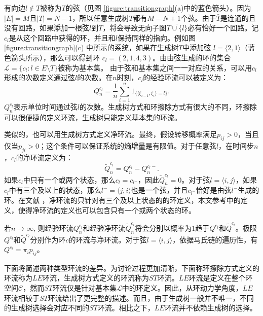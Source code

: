 
有向边$l \notin T$被称为$T$的弦（见图 \ref{figure:transitiongraph}(a)中的蓝色箭头）。因为$|E|=M$且$|T|= N-1$，所以任意生成树$T$都有$M-N+1$个弦。由于$\bar{T}$是连通的且没有回路，如果添加一根弦$l$到$T$，将会导致无向子图$\overline{T \cup \{l\}}$必有恰好一个回路。记$c_l$是从这个回路中获得的环，并且和$l$保持同样的指向。例如图 \ref{figure:transitiongraph}(c) 中所示的系统，如果在生成树$T$中添加弦 $l=\langle 2,1 \rangle$（蓝色箭头所示），那么可以得到环 $c_l=(2,1,4,3)$。由由弦生成的环的集合$\mathcal{L} = \{c_l: l\in E\setminus T\}$被称为基本集。
由于弦和基本集之间一一对应的关系，可以用$c_l$形成的次数定义通过弦$l$的次数。在$n$时刻，$c_l$的经验环流可以被定义为：
\begin{equation*}
    Q^{c_l}_n = \frac{1}{n}\sum_{i=1}^n1_{\{\langle\xi_{i-1},\xi_i\rangle=l\}}.
\end{equation*}
$Q^{c_l}_n$表示单位时间通过弦$l$的次数。生成树方式和环擦除方式有很大的不同，环擦除可以很便捷的定义环流，生成树只能定义基本集的环流。



类似的，也可以用生成树方式定义净环流。最终，假设转移概率满足$p_{ij}>0$，当且仅当$p_{ji}>0$；这个条件可以保证系统的熵增量是有限值\cite{Schnakenberg1976NetworkTO,jiang2004mathematical}。对于任意弦$l$，在时间步$n$，$c_l$的净环流定义为：
\begin{equation*}
    \tilde{Q}^{c_l}_n=Q^{c_l}_n-Q^{c_l-}_n.
\end{equation*}
如果$c_l$中只有一个或两个状态，那么$c_l = c_{l^-}$，因此$\tilde{Q}_n^{c_l}=0$。对于弦$l=\langle i,j \rangle$，如果$c_l$中有三个及以上的状态，那么$l^-=\langle j,i\rangle$也是一个弦，并且$c_{l^-}$恰好是由弦$l^-$生成的环。在文献 \cite{Schnakenberg1976NetworkTO, andrieux2007fluctuation, andrieux2007network}，净环流的只针对有三个及以上状态的的环定义，本文参考\cite{kalpazidou2007cycle}中的定义，使得净环流的定义也可以包含只有一个或两个状态的环。

若$n \to \infty$, 则经验环流$Q_n^{c_l}$和经验净环流$\tilde{Q}_n^{c_l}$将会分别以概率为$1$趋于$Q^{c_l}$和$\tilde{Q}^{c_l}$。极限$Q^{c_l}$和$\tilde{Q}^{c_l}$分别作为环$c$的环流与净环流。对于弦$l=\langle i,j \rangle$，依据马氏链的遍历性，有$Q^{c_l} = \pi_i p_{ij}$。

下面将简述两种类型环流的差异。为讨论过程更加清晰，下面称环擦除方式定义的环流称为$LE$环流，生成树方式定义的环流称为$ST$环流。$LE$环流是定义在整个环空间$\mathcal{C}$，然而$ST$环流仅是针对基本集$\mathcal{L}$中的环定义。因此，从环动力学角度，$LE$环流相较于$ST$环流给出了更完整的描述。而且，由于生成树一般并不唯一，不同的生成树选择会对应不同的$ST$环流。相比之下，$LE$环流并不依赖生成树的选择。

